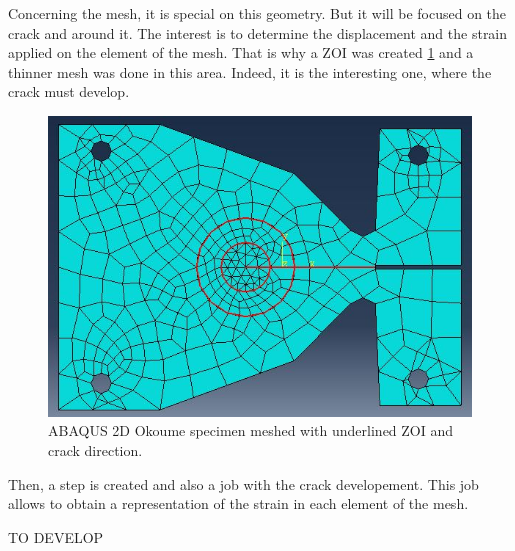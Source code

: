 Concerning the mesh, it is special on this geometry. But it will be focused on the crack and around it. The interest is to determine the displacement and the strain applied on the element of the mesh. That is why a ZOI was created \ref{fig:Fig16} and a thinner mesh was done in this area. Indeed, it is the interesting one, where the crack must develop.
\begin{figure}[h]
	\centering
	\includegraphics[scale=0.5]{Figures/Abaqus_Screenshot}
	\decoRule
	\caption[ABAQUS 2D specimen]{ABAQUS 2D Okoume specimen meshed with underlined ZOI and crack direction.}
	\label{fig:Fig16}
\end{figure}
Then, a step is created and also a job with the crack developement. This job allows to obtain a representation of the strain in each element of the mesh.



TO DEVELOP